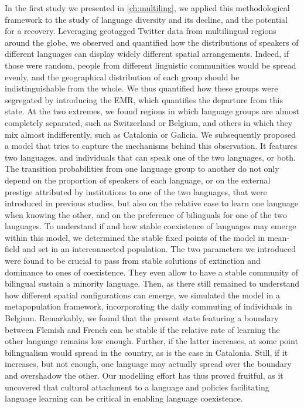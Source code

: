 \documentclass[../thesis.tex]{subfiles}
\begin{document}
In the first study we presented in \cref{ch:multiling}, we applied this methodological
framework to the study of language diversity and its decline, and the potential for a
recovery. Leveraging geotagged Twitter data from multilingual regions around the globe,
we observed and quantified how the distributions of speakers of different languages can
display widely different spatial arrangements. Indeed, if those were random, people from
different linguistic communities would be spread evenly, and the geographical
distribution of each group should be indistinguishable from the whole. We thus
quantified how these groups were segregated by introducing the \ac{EMR}, which
quantifies the departure from this state. At the two extremes, we found regions in which
language groups are almost completely separated, such as Switzerland or Belgium, and
others in which they mix almost indifferently, such as Catalonia or Galicia. We
subsequently proposed a model that tries to capture the mechanisms behind this
observation. It features two languages, and individuals that can speak one of the two
languages, or both. The transition probabilities from one language group to another do
not only depend on the proportion of speakers of each language, or on the external
prestige attributed by institutions to one of the two languages, that were introduced in
previous studies, but also on the relative ease to learn one language when knowing the
other, and on the preference of bilinguals for one of the two languages. To understand
if and how stable coexistence of languages may emerge within this model, we determined
the stable fixed points of the model in mean-field and set in an interconnected
population. The two parameters we introduced were found to be crucial to pass from
stable solutions of extinction and dominance to ones of coexistence. They even allow to
have a stable community of bilingual sustain a minority language. Then, as there still
remained to understand how different spatial configurations can emerge, we simulated the
model in a metapopulation framework, incorporating the daily commuting of individuals in
Belgium. Remarkably, we found that the present state featuring a boundary between
Flemish and French can be stable if the relative rate of learning the other language
remains low enough. Further, if the latter increases, at some point bilingualism would
spread in the country, as is the case in Catalonia. Still, if it increases, but not
enough, one language may actually spread over the boundary and overshadow the other. Our
modelling effort has thus proved fruitful, as it uncovered that cultural attachment to a
language and policies facilitating language learning can be critical in enabling
language coexistence.
\end{document}
